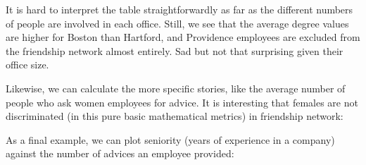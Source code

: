 \documentclass[
]{book}
\newenvironment{Shaded}{\begin{snugshade}}{\end{snugshade}}
\newcommand{\AttributeTok}[1]{\textcolor[rgb]{0.13,0.29,0.53}{#1}}
\newcommand{\CommentTok}[1]{\textcolor[rgb]{0.56,0.35,0.01}{\textit{#1}}}
\newcommand{\DecValTok}[1]{\textcolor[rgb]{0.00,0.00,0.81}{#1}}
\newcommand{\FunctionTok}[1]{\textcolor[rgb]{0.13,0.29,0.53}{\textbf{#1}}}
\newcommand{\NormalTok}[1]{#1}
\newcommand{\SpecialCharTok}[1]{\textcolor[rgb]{0.81,0.36,0.00}{\textbf{#1}}}
\begin{document}
It is hard to interpret the table straightforwardly as far as the different numbers of people are involved in each office. Still, we see that the average degree values are higher for Boston than Hartford, and Providence employees are excluded from the friendship network almost entirely. Sad but not that surprising given their office size.

Likewise, we can calculate the more specific stories, like the average number of people who ask women employees for advice. It is interesting that females are not discriminated (in this pure basic mathematical metrics) in friendship network:

\begin{Shaded}
\end{Shaded}

As a final example, we can plot seniority (years of experience in a company) against the number of advices an employee provided:
\end{document}
